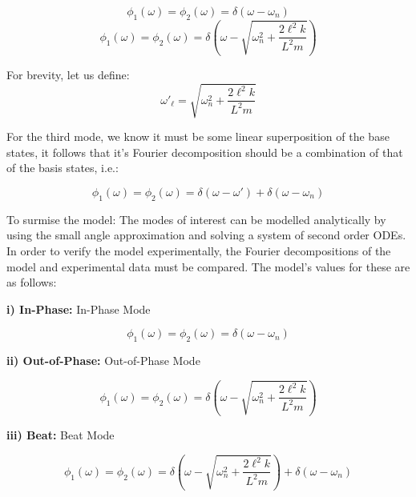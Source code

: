 \documentclass[aps,prl,reprint,10pt,amsmath,amssymb,superscriptaddress,a4paper, floatfix]{revtex4-2}
\begin{document}
\begin{equation}
\phi_1 \left(\omega\right) = \phi_2 \left(\omega\right) = \delta \left(\omega - \omega_n\right)
\end{equation} \begin{equation}
\phi_1 \left( \omega \right) = \phi_2 \left( \omega \right) = \delta \left(\omega - \sqrt{\omega_n^2 + \frac{2 \ell^2 k}{L^2 m}} \right)
\end{equation}

For brevity, let us define:
\begin{equation} \omega'_\ell = \sqrt{\omega_n^2 + \frac{2 \ell^2 k}{L^2 m}  } \label{omega'}  \end{equation}

For the third mode, we know it must be some linear superposition of the base states, it follows that it’s Fourier decomposition should be a combination of that of the basis states, i.e.:

\begin{equation}
\phi_1 \left( \omega \right) = \phi_2 \left( \omega \right) = \delta \left(\omega - \omega'  \right) + \delta \left(\omega - \omega_n\right)
\end{equation}

To surmise the model: The modes of interest can be modelled analytically by using the small angle approximation and solving a system of second order ODEs. In order to verify the model experimentally, the Fourier decompositions of the model and experimental data must be compared. The model's values for these are as follows:


\vspace*{12px}

\noindent \textbf{ i) In-Phase:}  In-Phase Mode 

\[ \phi_1 \left( \omega \right) = \phi_2 \left( \omega \right) = \delta \left(\omega - \omega_n\right) \]

\noindent \textbf{ ii) Out-of-Phase:} Out-of-Phase Mode 

\[ \phi_1 \left( \omega \right) = \phi_2 \left( \omega \right) = \delta \left(\omega - \sqrt{\omega_n^2 + \frac{2 \ell^2 k}{L^2 m}}  \right) \]
    
\noindent \textbf{ iii) Beat:} Beat Mode

\[ \phi_1 \left( \omega \right) = \phi_2 \left( \omega \right) = \delta \left(\omega - \sqrt{\omega_n^2 + \frac{2 \ell^2 k}{L^2 m}}  \right) + \delta \left(\omega - \omega_n\right) \]
\end{document}

